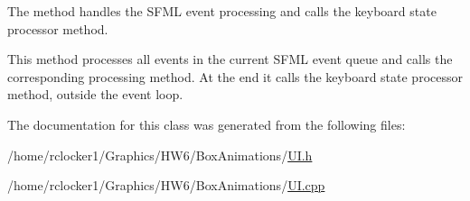 The method handles the S\+F\+ML event processing and calls the keyboard state processor method. 

This method processes all events in the current S\+F\+ML event queue and calls the corresponding processing method. At the end it calls the keyboard state processor method, outside the event loop. 

The documentation for this class was generated from the following files\+:\begin{DoxyCompactItemize}
\item 
/home/rclocker1/\+Graphics/\+H\+W6/\+Box\+Animations/\hyperlink{_u_i_8h}{U\+I.\+h}\item 
/home/rclocker1/\+Graphics/\+H\+W6/\+Box\+Animations/\hyperlink{_u_i_8cpp}{U\+I.\+cpp}\end{DoxyCompactItemize}
